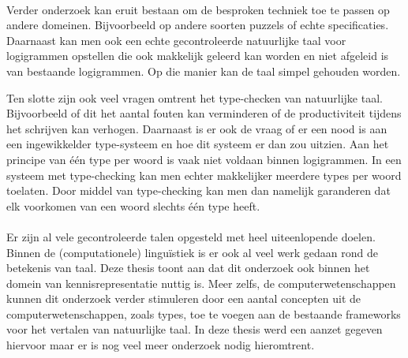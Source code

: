 \paragraph{} Verder onderzoek kan eruit bestaan om de besproken techniek toe te passen op andere domeinen. Bijvoorbeeld op andere soorten puzzels of echte specificaties. Daarnaast kan men ook een echte gecontroleerde natuurlijke taal voor logigrammen opstellen die ook makkelijk geleerd kan worden en niet afgeleid is van bestaande logigrammen. Op die manier kan de taal simpel gehouden worden.

Ten slotte zijn ook veel vragen omtrent het type-checken van natuurlijke taal. Bijvoorbeeld of dit het aantal fouten kan verminderen of de productiviteit tijdens het schrijven kan verhogen. Daarnaast is er ook de vraag of er een nood is aan een ingewikkelder type-systeem en hoe dit systeem er dan zou uitzien. Aan het principe van één type per woord is vaak niet voldaan binnen logigrammen. In een systeem met type-checking kan men echter makkelijker meerdere types per woord toelaten. Door middel van type-checking kan men dan namelijk garanderen dat elk voorkomen van een woord slechts één type heeft.

\paragraph{} Er zijn al vele gecontroleerde talen opgesteld met heel uiteenlopende doelen. Binnen de (computationele) linguïstiek is er ook al veel werk gedaan rond de betekenis van taal. Deze thesis toont aan dat dit onderzoek ook binnen het domein van kennisrepresentatie nuttig is. Meer zelfs, de computerwetenschappen kunnen dit onderzoek verder stimuleren door een aantal concepten uit de computerwetenschappen, zoals types, toe te voegen aan de bestaande frameworks voor het vertalen van natuurlijke taal. In deze thesis werd een aanzet gegeven hiervoor maar er is nog veel meer onderzoek nodig hieromtrent.
